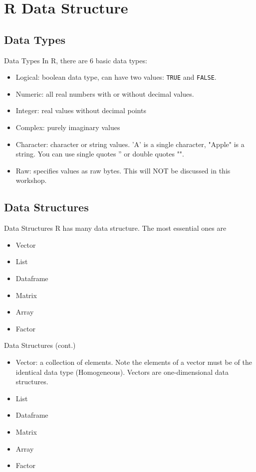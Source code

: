 \documentclass{beamer}
\begin{document}
\section{R Data Structure}

\subsection{Data Types}

\begin{frame}{Data Types}
    In R, there are 6 basic data types:
    \begin{itemize}
        \item Logical: boolean data type, can have two values: \texttt{TRUE} and \texttt{FALSE}.
        \item Numeric: all real numbers with or without decimal values.
        \item Integer: real values without decimal points
        \item Complex: purely imaginary values
        \item Character: character or string values. 'A' is a single character, "Apple" is a string. You can use single quotes '' or double quotes "".
        \item Raw: specifies values as raw bytes. This will NOT be discussed in this workshop.
    \end{itemize}
\end{frame}

\subsection{Data Structures}

\begin{frame}{Data Structures}
R has many data structure. The most essential ones are
\begin{itemize}
    \item Vector
    \item List
    \item Dataframe
    \item Matrix
    \item Array
    \item Factor
\end{itemize}
    
\end{frame}

\begin{frame}{Data Structures (cont.)}
\begin{itemize}
    \item Vector: a collection of elements. Note the elements of a vector must be of the identical data type (Homogeneous). Vectors are one-dimensional data structures.
    \item List
    \item Dataframe
    \item Matrix
    \item Array
    \item Factor
\end{itemize}
    
\end{frame}
\end{document}
